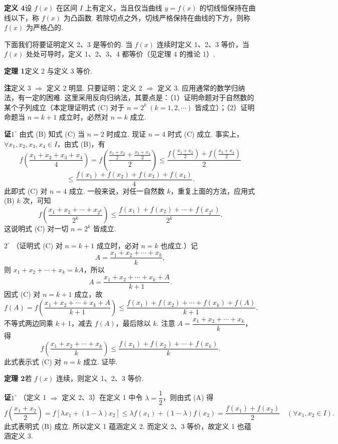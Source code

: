 \documentclass[UTF8,12pt,a4paper,fontset=fandol]{ctexart}
\begin{document}
\noindent\textbf{定义 4}\quad 设 $f(x)$ 在区间 $I$ 上有定义，当且仅当曲线 $y=f(x)$ 的切线恒保持在曲线以下，称 $f(x)$ 为凸函数. 若除切点之外，切线严格保持在曲线的下方，则称 $f(x)$ 为严格凸的.

下面我们将要证明定义 2、3 是等价的. 当 $f(x)$ 连续时定义 1、2、3 等价，当 $f(x)$ 处处可导时，定义 1、2、3、4 都等价（见定理 4 的推论 1）.

\noindent\textbf{定理 1}\quad 定义 2 与定义 3 等价.

\noindent\textbf{注}\quad 定义 3 $\Rightarrow$ 定义 2 明显. 只要证明：定义 2 $\Rightarrow$ 定义 3. 应用通常的数学归纳法，有一定的困难. 这里采用反向归纳法，其要点是：（1）证明命题对于自然数的某个子列成立（本定理证明式 (C) 对于 $n=2^k\ (k=1,2,\cdots)$ 皆成立）；（2）证明命题当 $n=k+1$ 成立时，必然对 $n=k$ 成立.

\noindent\textbf{证}\quad $1^\circ$ 由式 (B) 知式 (C) 当 $n=2$ 时成立. 现证 $n=4$ 时式 (C) 成立. 事实上，$\forall x_1,x_2,x_3,x_4\in I$，由式 (B)，有
\[
  f\left(\frac{x_1+x_2+x_3+x_4}{4}\right)
  =f\left(\frac{\frac{x_1+x_2}{2}+\frac{x_3+x_4}{2}}2\right)
  \le\frac{f\left(\frac{x_1+x_2}{2}\right)+f\left(\frac{x_3+x_4}{2}\right)}2
\]
\[
  \le\frac{f(x_1)+f(x_2)+f(x_3)+f(x_4)}4.
\]
此即式 (C) 对 $n=4$ 成立. 一般来说，对任一自然数 $k$，重复上面的方法，应用式 (B) $k$ 次，可知
\[
  f\left(\frac{x_1+x_2+\cdots+x_{2^k}}{2^k}\right)
  \le\frac{f(x_1)+f(x_2)+\cdots+f(x_{2^k})}{2^k}.
\]
这说明式 (C) 对一切 $n=2^k$ 皆成立.

$2^\circ$ （证明式 (C) 对 $n=k+1$ 成立时，必对 $n=k$ 也成立.）记
\[
  A=\frac{x_1+x_2+\cdots+x_k}{k},
\]
则 $x_1+x_2+\cdots+x_k=kA$，所以
\[
  A=\frac{x_1+x_2+\cdots+x_k+A}{k+1}.
\]
因式 (C) 对 $n=k+1$ 成立，故
\[
  f(A)=f\left(\frac{x_1+x_2+\cdots+x_k+A}{k+1}\right)
  \le\frac{f(x_1)+f(x_2)+\cdots+f(x_k)+f(A)}{k+1}.
\]
不等式两边同乘 $k+1$，减去 $f(A)$，最后除以 $k$. 注意 $A=\dfrac{x_1+x_2+\cdots+x_k}{k}$，得
\[
  f\left(\frac{x_1+x_2+\cdots+x_k}{k}\right)
  \le\frac{f(x_1)+f(x_2)+\cdots+f(x_k)}{k}.
\]
此式表示式 (C) 对 $n=k$ 成立. 证毕.

\noindent\textbf{定理 2}\quad 若 $f(x)$ 连续，则定义 1、2、3 等价.

\noindent\textbf{证}\quad $1^\circ$ （定义 1 $\Rightarrow$ 定义 2、3）在定义 1 中令 $\lambda=\dfrac12$，则由式 (A) 得
\[
  f\left(\frac{x_1+x_2}{2}\right)
  =f[\lambda x_1+(1-\lambda)x_2]
  \le\lambda f(x_1)+(1-\lambda)f(x_2)
  =\frac{f(x_1)+f(x_2)}2\quad(\forall x_1,x_2\in I).
\]
此式表明式 (B) 成立. 所以定义 1 蕴涵定义 2. 而定义 2、3 等价，故定义 1 也蕴涵定义 3.
\end{document}
